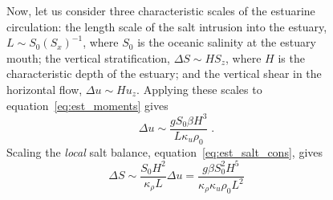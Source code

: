 \documentclass[11pt]{report}
\numberwithin{equation}{section}
\begin{document}
\begin{figure}
Now, let us consider three characteristic scales of the estuarine circulation: the length scale of the salt intrusion into the estuary, $L \sim S_0 (S_x)^{-1}$, where $S_0$ is the oceanic salinity at the estuary mouth; the vertical stratification, $\Delta S \sim H S_z$, where $H$ is the characteristic depth of the estuary; and the vertical shear in the horizontal flow, $\Delta u \sim H u_z$.  Applying these scales to equation~\ref{eq:est_moments} gives
\begin{equation}
    \Delta u \sim \frac{g S_0 \beta H^3}{L \kappa_u \rho_0} \; .
    \label{eq:est_deltau}
\end{equation}
Scaling the \emph{local} salt balance, equation~\ref{eq:est_salt_cons}, gives
\begin{equation}
    \Delta S \sim \frac{S_0 H^2}{\kappa_\rho L} \Delta u 
             = \frac{g \beta S_0^2 H^5}{\kappa_{\rho} \kappa_u \rho_0 L^2}
    \label{eq:est_deltas}
\end{equation}


\end{figure}
\end{document}
